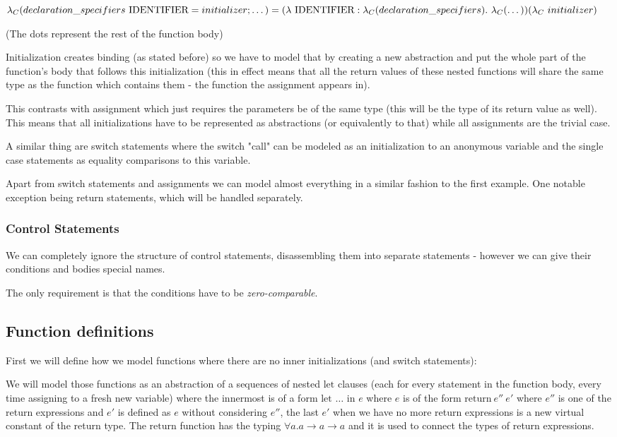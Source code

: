 $\lambda_C(declaration\_specifiers\ \text{IDENTIFIER} = initializer; \dots) = \\ (\lambda\ \text{IDENTIFIER} : \lambda_C(declaration\_specifiers) .\ \lambda_C(\dots)) (\lambda_C\ initializer)$

(The dots represent the rest of the function body)

Initialization creates binding (as stated before) so we have to model that by creating a new abstraction and put the whole part of the function's body that follows this initialization (this in effect means that all the return values of these nested functions will share the same type as the function which contains them - the function the assignment appears in).

This contrasts with assignment which just requires the parameters be of the same type (this will be the type of its return value as well). This means that all initializations have to be represented as abstractions (or equivalently to that) while all assignments are the trivial case.

A similar thing are switch statements where the switch "call" can be modeled as an initialization to an anonymous variable and the single case statements as equality comparisons to this variable.

Apart from switch statements and assignments we can model almost everything in a similar fashion to the first example. One notable exception being return statements, which will be handled separately.

\subsubsection{Control Statements}

We can completely ignore the structure of control statements, disassembling them into separate statements - however we can give their conditions and bodies special names.

The only requirement is that the conditions have to be \emph{zero-comparable}. %

\subsection{Function definitions}

First we will define how we model functions where there are no inner initializations (and switch statements):

We will model those functions as an abstraction of a sequences of nested $\text{let}$ clauses (each for every statement in the function body, every time assigning to a fresh new variable) where the innermost is of a form $\text{let } \dots \text{ in } e$ where $e$ is of the form $\text{return}\ e''\ e'$ where $e''$ is one of the return expressions and $e'$ is defined as $e$ without considering $e''$, the last $e'$ when we have no more return expressions is a new virtual constant of the return type. The $\text{return}$ function has the typing $\forall a . a \rightarrow a \rightarrow a$ and it is used to connect the types of return expressions.

